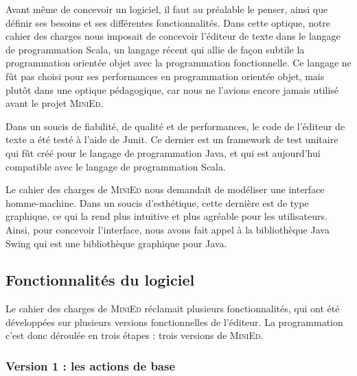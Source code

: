 \documentclass[a4paper]{article}
\begin{document}
		\vspace{0.5cm}

		Avant même de concevoir un logiciel, il faut au préalable le penser, ainsi que définir ses besoins et ses différentes fonctionnalités. Dans cette optique, notre cahier des charges nous imposait de concevoir l’éditeur de texte dans le langage de programmation Scala, un langage récent qui allie de façon subtile la programmation orientée objet avec la programmation fonctionnelle. Ce langage ne fût pas choisi pour ses performances en programmation orientée objet, mais plutôt dans une optique pédagogique, car nous ne l'avions encore jamais utilisé avant le projet \textsc{MiniEd}.

		\vspace{0.5cm}

		Dans un soucis de fiabilité, de qualité et de performances, le code de l'éditeur de texte a été testé à l'aide de Junit. Ce dernier est un framework de test unitaire qui fût créé pour le langage de programmation Java, et qui est aujourd’hui compatible avec le langage de programmation Scala.

		\vspace{0.5cm}

		Le cahier des charges de \textsc{MiniEd} nous demandait de modéliser une interface homme-machine. Dans un soucis d'esthétique, cette dernière est de type graphique, ce qui la rend plus intuitive et plus agréable pour les utilisateurs. Ainsi, pour concevoir l'interface, nous avons fait appel à la bibliothèque Java Swing qui est une bibliothèque graphique pour Java.

		\vspace{0.5cm}

		\subsection{Fonctionnalités du logiciel}

		\vspace{0.5cm}

		Le cahier des charges de \textsc{MiniEd} réclamait plusieurs fonctionnalités, qui ont été développées sur plusieurs versions fonctionnelles de l'éditeur. La programmation c'est donc déroulée en trois étapes : trois versions de \textsc{MiniEd}.

		\vspace{0.5cm}

			\subsubsection{Version 1 : les actions de base}
\end{document}
